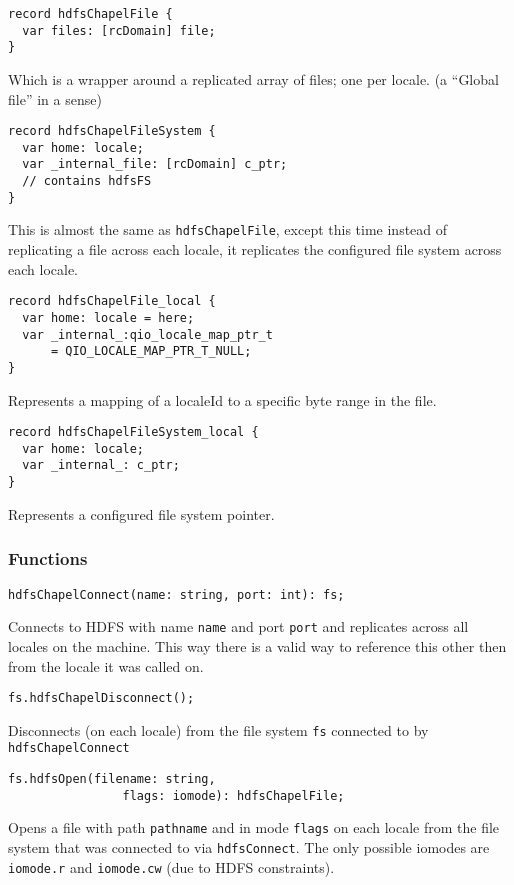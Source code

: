 \begin{lstlisting}
record hdfsChapelFile {
  var files: [rcDomain] file;
}
\end{lstlisting}
Which is a wrapper around a replicated array of files; one per locale. (\ie a
``Global file'' in a sense)

\begin{lstlisting}
record hdfsChapelFileSystem {
  var home: locale;
  var _internal_file: [rcDomain] c_ptr; 
  // contains hdfsFS
}
\end{lstlisting}
This is almost the same as {\tt hdfsChapelFile}, except this time instead of replicating
a file across each locale, it replicates the configured file system across each locale.

\begin{lstlisting}
record hdfsChapelFile_local {
  var home: locale = here;
  var _internal_:qio_locale_map_ptr_t 
      = QIO_LOCALE_MAP_PTR_T_NULL;
}
\end{lstlisting}
Represents a mapping of a localeId to a specific byte range in the file.

\begin{lstlisting}
record hdfsChapelFileSystem_local {
  var home: locale;
  var _internal_: c_ptr;
}
\end{lstlisting}
Represents a configured file system pointer. 

\subsubsection{Functions}
\begin{lstlisting}
hdfsChapelConnect(name: string, port: int): fs;
\end{lstlisting}
Connects to HDFS with name {\tt name} and port {\tt port} and replicates across all locales
on the machine. This way there is a valid way to reference this other then from the
locale it was called on.

\begin{lstlisting}
fs.hdfsChapelDisconnect();
\end{lstlisting}
Disconnects (on each locale) from the file system {\tt fs} connected to
by {\tt hdfsChapelConnect}

\begin{lstlisting}
fs.hdfsOpen(filename: string, 
                flags: iomode): hdfsChapelFile;
\end{lstlisting}
Opens a file with path {\tt pathname} and in mode {\tt flags} on each locale from the file system
that was connected to via {\tt hdfsConnect}. The only possible iomodes are
{\tt iomode.r} and {\tt iomode.cw} (due to HDFS constraints).

